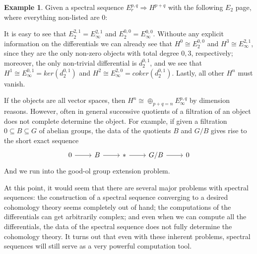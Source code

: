 \documentclass{article}
\theoremstyle{definition}
\theoremstyle{definition}
\theoremstyle{definition}
\theoremstyle{definition}
\theoremstyle{definition}
\theoremstyle{definition}
\theoremstyle{definition}
\newtheorem{example}{Example}[section]
\begin{document}
\begin{tcolorbox}[colback=yellow!5!white,colframe=yellow!30!white]
\begin{example}
	Given a spectral sequence $E_r^{p,q}\Longrightarrow H^{p+q}$ with the following $E_2$ page, where everything non-listed are $0$:

	It is easy to see that $E_{2}^{2,1}=E_{\infty}^{2,1}$ and $E_{2}^{0,0}=E_{\infty}^{0,0}$. Withoute any explicit information on the differentials we can already see that $H^0\cong E_{2}^{0,0}$ and $H^3\cong E_{\infty}^{2,1}$, since they are the only non-zero objects with total degree $0,3$, respectively; moreover, the only non-trivial differential is $d_2^{0,1}$, and we see that $H^1\cong E_{\infty}^{0,1}=ker(d_2^{0,1})$ and $H^2\cong E_{\infty}^{2,0}=coker(d_2^{0,1})$. Lastly, all other $H^n$ must vanish. 
	
	
	
\end{example}
\end{tcolorbox}



If the objects are all vector spaces, then $H^n\cong \oplus_{p+q=n} E_{\infty}^{p,q}$ by dimension reasons. However, often in general successive quotients of a filtration of an object does not complete determine the object. For example, if given a filtration $0\subseteq B\subseteq G$
of abelian groups, the data of the quotients $B$ and $G/B$ gives rise to the short exact sequence 
\[\begin{tikzcd}
0\arrow[r]&B\arrow[r]&*\arrow[r]&G/B\arrow[r]&0
\end{tikzcd}\]
And we run into the good-ol group extension problem. 

At this point, it would seem that there are several major problems with spectral sequences: the construction of a spectral sequence converging to a desired cohomology theory seems completely out of hand; the computations of the differentials can get arbitrarily complex; and even when we can compute all the differentials, the data of the spectral sequence does not fully determine the cohomology theory. It turns out that even with these inherent problems, spectral sequences will still serve as a very powerful computation tool.
\end{document}
